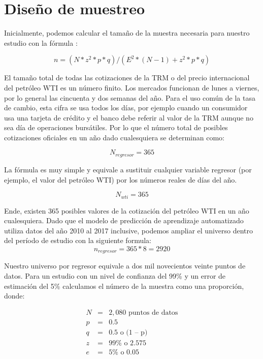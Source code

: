 \section{Diseño de muestreo}

Inicialmente, podemos calcular el tamaño de la muestra necesaria para nuestro estudio con la fórmula \cite{mendehall}:

\begin{equation}
   n =  (N* z^2*p*q)/(E^2*(N-1)+ z^2*p*q)
\end{equation}

El tamaño total de todas las cotizaciones de la TRM o del precio internacional del petróleo WTI es un número finito. Los mercados funcionan de lunes a viernes, por lo general las cincuenta y dos semanas del año. Para el uso común de la tasa de cambio, esta cifra se usa todos los días, por ejemplo cuando un consumidor usa una tarjeta de crédito y el banco debe referir al valor de la TRM aunque no sea día de operaciones bursátiles. Por lo que el número total de posibles cotizaciones oficiales en un año dado cualesquiera se determinan como:

\begin{equation}
    N_{regresor} = 365
\end{equation}

La fórmula es muy simple y equivale a sustituir cualquier variable regresor (por ejemplo, el valor del petróleo WTI) por los números reales de días del año.

\begin{equation}
    N_{wti} = 365
\end{equation}

Ende, existen 365 posibles valores de la cotización del petróleo WTI en un año cualesquiera. Dado que el modelo de predicción de aprendizaje automatizado utiliza datos del año 2010 al 2017 inclusive, podemos ampliar el universo dentro del período de estudio con la siguiente formula:
\begin{equation}
    n_{regresor} = 365 * 8 = 2920
\end{equation}

Nuestro universo por regresor equivale a dos mil novecientos veinte puntos de datos. Para un estudio con un nivel de confianza del 99\% y un error de estimación del 5\% calculamos el número de la muestra como una proporción, donde:

\begin{eqnarray*}
  N &=& 2,080 \text{ puntos de datos} \\
  p &=& 0.5 \\
  q &=& 0.5 \text{ o (1 – p)} \\
  z &=& 99\% \text{ o 2.575} \\
  e &=& 5\% \text{ o 0.05} \\
\end{eqnarray*}

